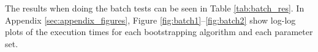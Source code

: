 
The results when doing the batch tests can be seen in Table \ref{tab:batch_res}. In Appendix \ref{sec:appendix_figures}, Figure \ref{fig:batch1}--\ref{fig:batch2} show log-log plots of the execution times for each bootstrapping algorithm and each parameter set.

